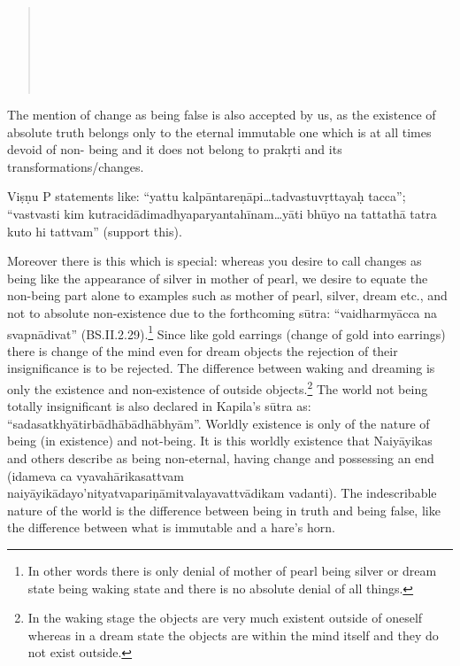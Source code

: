 \begin{verse}
\\
\\
\\
\\
\\
\end{verse}

The mention of change as being false is also accepted by us, as the existence of absolute truth belongs only to the eternal immutable one which is at all times devoid of non- being and it does not belong to prakṛti and its transformations/changes.

Viṣṇu P statements like: “yattu kalpāntareṇāpi…tadvastuvṛttayaḥ tacca”; “vastvasti kim kutracidādimadhyaparyantahīnam…yāti bhūyo na tattathā tatra kuto hi tattvam” (support this).

Moreover there is this which is special: whereas you desire to call changes as being like the appearance of silver in mother of pearl, we desire to equate the non-being part alone to examples such as mother of pearl, silver, dream etc., and not to absolute non-existence due to the forthcoming sūtra: “vaidharmyācca na svapnādivat” (BS.II.2.29).\footnote{In other words there is only denial of mother of pearl being silver or dream state being waking state and there is no absolute denial of all things.} Since like gold earrings (change of gold into earrings) there is change of the mind even for dream objects the rejection of their insignificance is to be rejected. The difference between waking and dreaming is only the existence and non-existence of outside objects.\footnote{In the waking stage the objects are very much existent outside of oneself whereas in a dream state the objects are within the mind itself and they do not exist outside.} The world not being totally insignificant is also declared in Kapila’s sūtra as: “sadasatkhyātirbādhābādhābhyām”.     Worldly existence is only of the nature of being (in existence) and not-being. It is this worldly existence that Naiyāyikas and others describe as being non-eternal, having change and possessing an end (idameva ca vyavahārikasattvam naiyāyikādayo’nityatvapariṇāmitvalayavattvādikam vadanti). The indescribable nature of the world is the difference between being in truth and being false, like the difference between what is immutable and a hare’s horn.

